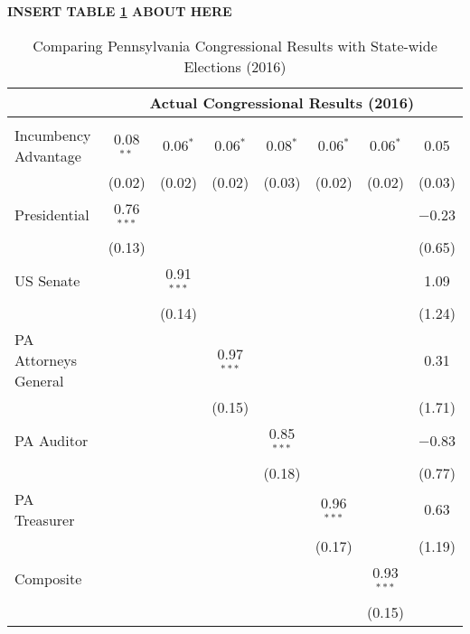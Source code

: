 


 \begin{center}\textbf{INSERT TABLE \ref{tab:tab_congress_predict} ABOUT HERE} \end{center}


\begin{table}[!htbp] \centering 
  \caption{Comparing Pennsylvania Congressional Results with State-wide Elections (2016)} 
  \label{tab:tab_congress_predict} 
\begin{tabular}{@{\extracolsep{0pt}}lccccccc} 
\\[-1.8ex] & \multicolumn{7}{c}{Actual Congressional Results (2016)} \\ 
\hline \\[-1.8ex] 
 Incumbency Advantage & 0.08$^{**}$ & 0.06$^{*}$ & 0.06$^{*}$ & 0.08$^{*}$ & 0.06$^{*}$ & 0.06$^{*}$ & 0.05 \\ 
  & (0.02) & (0.02) & (0.02) & (0.03) & (0.02) & (0.02) & (0.03) \\ 
  Presidential & 0.76$^{***}$ &  &  &  &  &  & $-$0.23 \\ 
  & (0.13) &  &  &  &  &  & (0.65) \\ 
  US Senate &  & 0.91$^{***}$ &  &  &  &  & 1.09 \\ 
  &  & (0.14) &  &  &  &  & (1.24) \\ 
  PA Attorneys General &  &  & 0.97$^{***}$ &  &  &  & 0.31 \\ 
  &  &  & (0.15) &  &  &  & (1.71) \\ 
  PA Auditor &  &  &  & 0.85$^{***}$ &  &  & $-$0.83 \\ 
  &  &  &  & (0.18) &  &  & (0.77) \\ 
  PA Treasurer &  &  &  &  & 0.96$^{***}$ &  & 0.63 \\ 
  &  &  &  &  & (0.17) &  & (1.19) \\ 
  Composite &  &  &  &  &  & 0.93$^{***}$ &  \\ 
  &  &  &  &  &  & (0.15) &  \\ 

\end{tabular}
\end{table}
